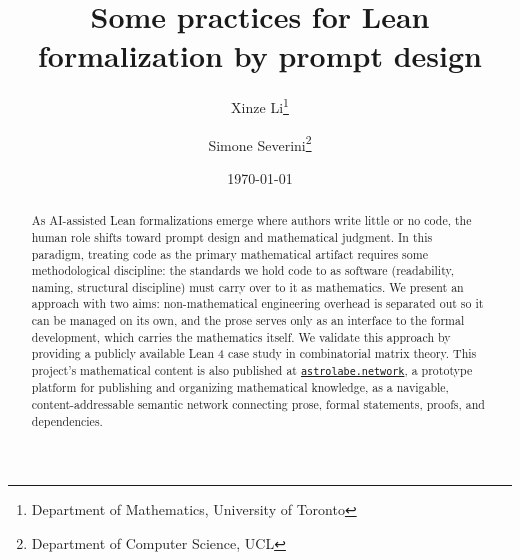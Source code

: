 \documentclass[11pt]{article}
\title{Some practices for Lean formalization by prompt design}
\author{
 Xinze Li\thanks{Department of Mathematics, University of Toronto}
 \and
 Simone Severini\thanks{Department of Computer Science,
  UCL}
}
\date{\today}
\theoremstyle{definition}
\theoremstyle{remark}
\begin{document}
\maketitle

\begin{abstract}


As AI-assisted Lean formalizations emerge where authors write little or no code, the human role shifts toward prompt design and mathematical judgment. In this paradigm, treating code as the primary mathematical artifact requires some methodological discipline: the standards we hold code to as software (readability, naming, structural discipline) must carry over to it as mathematics. We present an approach with two aims: non-mathematical engineering overhead is separated out so it can be managed on its own, and the prose serves only as an interface to the formal development, which carries the mathematics itself. 
We validate this approach by providing a publicly available Lean 4 case study in combinatorial matrix theory. This project's mathematical content is also published at \href{https://www.astrolabe.network/writing/hessenberg-digraphs}{\texttt{astrolabe.network}}, a prototype platform for publishing and organizing mathematical knowledge, as a navigable, content-addressable semantic network connecting prose, formal statements, proofs, and dependencies.



\end{abstract}
\end{document}
